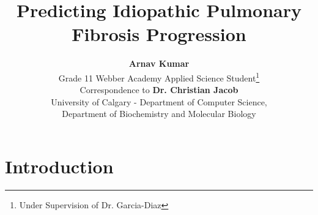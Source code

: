 \documentclass[12pt]{article}
\title{Predicting Idiopathic Pulmonary Fibrosis Progression}
\author{\textbf{Arnav Kumar} \\ 
Grade 11 Webber Academy Applied Science Student\thanks{Under Supervision of Dr. Garcia-Diaz} \\[0.1in] 
Correspondence to \textbf{Dr. Christian Jacob} \\ 
University of Calgary - Department of Computer Science, \\ 
Department of Biochemistry and Molecular Biology}
\date{}
\newenvironment{sciabstract}{%
\begin{quote} \bf}
{\end{quote}}
\begin{document}
 


\baselineskip24pt


\maketitle 








\section*{Introduction}
\end{document}
